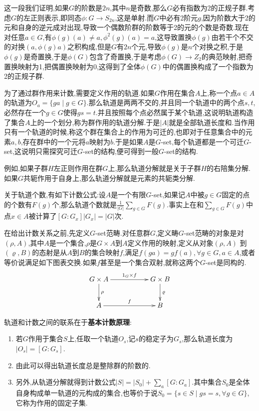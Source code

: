这一段我们证明,如果$G$的阶数是$2n$,其中$n$是奇数,那么$G$必有指数为2的正规子群.考虑$G$的左正则表示,即同态$\phi:G\to S_{2n}$,这是单射.而$G$中必有2阶元$g$,因为阶数大于2的元和自身的逆元成对出现,导致一个偶数阶群的阶数等于2的元的个数是奇数.现在对任意$a\in G$,有$\phi(g)(a)\not=a,\phi^2(g)(a)=a$,这导致置换$\phi(g)$由若干个不交的对换$(a,\phi(g)a)$之积构成,但是$G$有$2n$个元,导致$\phi(g)$是$n$个对换之积,于是$\phi(g)$是奇置换,于是$\phi(G)$包含了奇置换,于是考虑$\phi(G)\to Z_2$的典范映射,把奇置换映射为1,把偶置换映射为0,这得到了全体$\phi(G)$中的偶置换构成了一个指数为2的正规子群.

为了通过群作用来计数,需要定义作用的轨道.如果$G$作用在集合$A$上,称一个点$a\in A$的轨道为$O_a=\{ga\mid g\in G\}$.那么轨道是两两不交的,并且同一个轨道中的两个点$s,t$,必然存在一个$g\in G$使得$gs=t$.并且按照每个点必然属于某个轨道,这说明轨道构造了集合$A$上的一个划分,称为群作用的轨道分解.于是$|A|$就是全部轨道长度和.当作用只有一个轨道的时候,称这个群在集合上的作用为可迁的,也即对于任意集合中的元素$a,b$,存在群中的一个元将$a$映射为$b$.于是如果$A$是$G$-set,每个轨道都是一个可迁$G$-set,这说明只需探究可迁$G$-set的结构,便可得到一般$G$-set的结构.

例如,如果子群$H$左正则作用在群$G$上,那么轨道分解就是关于子群$H$的右陪集分解.如果$G$共轭作用于自身上,那么轨道分解就是元素的共轭类分解.

关于轨道个数,有如下计数公式:设$A$是一个有限$G$-set,如果记$A$中被$g\in G$固定的点的个数有$F(g)$个,那么轨道个数就是$\frac{1}{|G|}\sum_{g\in G}F(g)$.事实上在和$\sum_{g\in G}F(g)$中点$x\in A$被计算了$[G:G_x]|G_x|=|G|$次.

在给出计数关系之前,先定义$G$-set范畴.对任意群$G$,定义畴$G$-set范畴的对象是对$(\rho,A)$,其中$A$是一个集合,$\rho$是$G\times A$到$A$定义作用的映射,定义从对象$(\rho,A)$ 到$(\varrho,B)$的态射是从$A$到$B$的集合映射$f$,满足$f(ga)=gf(a),\forall g\in G,a\in A$,或者等价说满足如下图表交换.如果$f$甚至是一个集合双射,就称这两个$G$-set是同构的.
$$\xymatrix{
	G\times A\ar[rr]^{1_G\times f}\ar[d]^{\rho}&&G\times B\ar[d]^{\varrho}\\
	A\ar[rr]^{f}&&B
}$$

轨道和计数之间的联系在于\textbf{基本计数原理}:
\begin{enumerate}
	\item 若$G$作用于集合$S$上,任取一个轨道$O_s$,记$s$的稳定子为$G_s$,那么轨道长度为$|O_s|=[G:G_s]$.
	\item 由此可以得出轨道长度总是整除群的阶数的.
	\item 另外,从轨道分解就得到计数公式$|S|=|S_0|+\sum_{a}[G:G_a]$.其中集合$S_0$是全体自身构成单一轨道的元构成的集合,也等价于说$S_0=\{s\in S\mid gs=s,\forall g\in G\}$,它称为作用的固定子集.
\end{enumerate}

